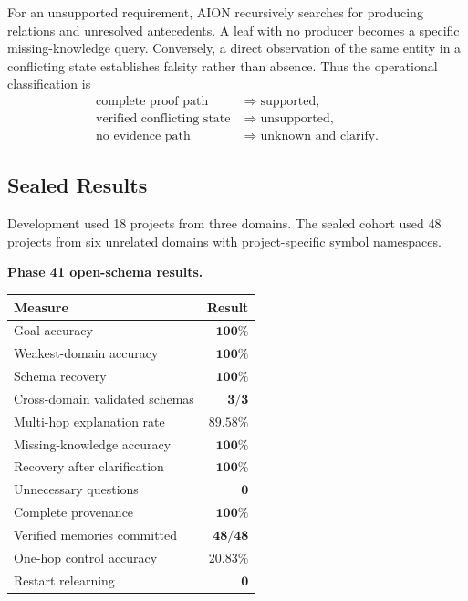 For an unsupported requirement, AION recursively searches for producing
relations and unresolved antecedents.  A leaf with no producer becomes a
specific missing-knowledge query.  Conversely, a direct observation of the
same entity in a conflicting state establishes falsity rather than absence.
Thus the operational classification is
\[
\begin{aligned}
\text{complete proof path} &\Rightarrow \text{supported},\\
\text{verified conflicting state} &\Rightarrow \text{unsupported},\\
\text{no evidence path} &\Rightarrow \text{unknown and clarify}.
\end{aligned}
\]

\subsection{Sealed Results}

Development used 18 projects from three domains.  The sealed cohort used 48
projects from six unrelated domains with project-specific symbol namespaces.

\begin{center}
\small
\textbf{Phase 41 open-schema results.}\par\smallskip
\centering
\begin{tabular}{lr}
\hline
Measure & Result \\
\hline
Goal accuracy & \(\mathbf{100\%}\) \\
Weakest-domain accuracy & \(\mathbf{100\%}\) \\
Schema recovery & \(\mathbf{100\%}\) \\
Cross-domain validated schemas & \(\mathbf{3/3}\) \\
Multi-hop explanation rate & \(\mathbf{89.58\%}\) \\
Missing-knowledge accuracy & \(\mathbf{100\%}\) \\
Recovery after clarification & \(\mathbf{100\%}\) \\
Unnecessary questions & \(\mathbf{0}\) \\
Complete provenance & \(\mathbf{100\%}\) \\
Verified memories committed & \(\mathbf{48/48}\) \\
One-hop control accuracy & \(20.83\%\) \\
Restart relearning & \(\mathbf{0}\) \\
\hline
\end{tabular}
\end{center}

